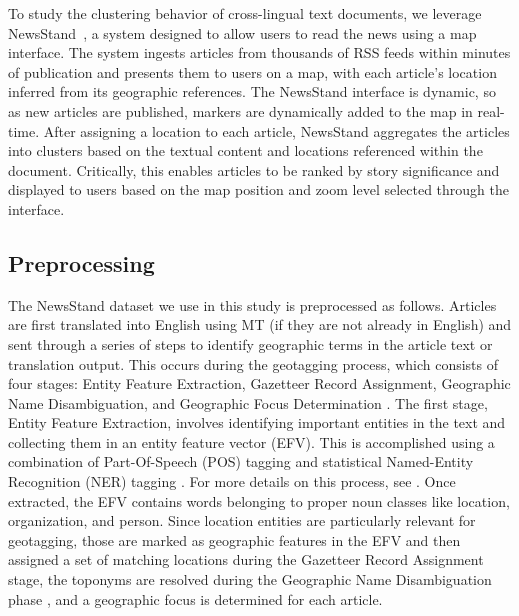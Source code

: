 To study the clustering behavior of cross-lingual text documents, we leverage NewsStand~\cite{Teit08}, a system designed to allow users to read the news using a map interface. The system ingests articles from thousands of RSS feeds within minutes of publication and presents them to users on a map, with each article's location inferred from its geographic references. 
The NewsStand interface is dynamic, so as new articles are published, markers are dynamically added to the map in real-time. 
After assigning a location to each article, NewsStand aggregates the articles into clusters based on the textual content and locations referenced within the document. Critically, this enables articles to be ranked by story significance and displayed to users based on the map position and zoom level selected through the interface.


\subsection{Preprocessing} \label{pipeline}
The NewsStand dataset we use in this study is preprocessed as follows.
Articles are first translated into English using MT (if they are not already in English) and sent through a series of steps to identify geographic terms in the article text or translation output. This occurs during the geotagging process, which consists of four stages: Entity Feature Extraction, Gazetteer Record Assignment, Geographic Name Disambiguation, and Geographic Focus Determination \cite{Teit08}. The first stage, Entity Feature Extraction, involves identifying important entities in the text and collecting them in an entity feature vector (EFV). This is accomplished using a combination of Part-Of-Speech (POS) tagging and statistical Named-Entity Recognition (NER) tagging \cite{NER}. 
For more details on this process, see \cite{Same09d, Lieb07, Ho12}. Once extracted, the EFV contains words belonging to proper noun classes like location, organization, and person. 
Since location entities are particularly relevant for geotagging, those are marked as geographic features in the EFV and then assigned a set of matching locations during the Gazetteer Record Assignment stage, the toponyms are resolved during the Geographic Name Disambiguation phase \cite{Leid11, Lieb10b, Lieb11, Lieb12, Same14b, Schn21}, and a geographic focus is determined for each article.